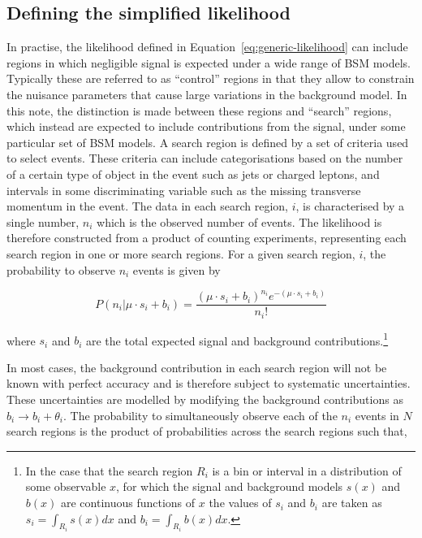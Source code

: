 \subsection{Defining the simplified likelihood}
In practise, the likelihood defined in Equation~\ref{eq:generic-likelihood} can include regions in which negligible signal is expected under a wide 
range of BSM models. Typically these are referred to as ``control'' regions in that they allow to constrain the nuisance parameters that  
cause large variations in the background model.
In this note, the distinction is made between these regions and ``search'' regions, which instead 
are expected to include contributions from the signal, under some particular set of BSM models. A search region 
is defined by a set of criteria used to select events. These criteria can include categorisations based on 
the number of a certain type of object in the event such as jets or 
charged leptons, and intervals in some discriminating variable such as the missing transverse momentum in the event. The data in each search region, $i$, is characterised 
by a single number, $n_{i}$ which is the observed number of events. The likelihood is therefore constructed from a product of counting 
experiments, representing each search region in one or more search regions. 
For a given search region, $i$, the probability to observe $n_{i}$ events is given by

\begin{equation}
 P(n_{i}|\mu \cdot s_{i}+b_{i}) = \dfrac{(\mu \cdot s_{i}+b_{i})^{n_{i}} e^{-(\mu \cdot s_{i}+b_{i})} }{n_{i}!}
\label{eq:poisson-likelihood}
\end{equation}

where $s_{i}$ and $b_{i}$ are the total expected signal and background contributions.\footnote{In the case 
that the search region $R_{i}$ is a bin or interval in a distribution of some observable $x$, for which the signal and background models $s(x)$ 
and $b(x)$ are continuous functions of $x$ the values of $s_{i}$ and $b_{i}$ are taken as 
$s_{i}=\int_{R_{i}} s(x)dx$ and $b_{i}=\int_{R_{i}} b(x)dx$.}

In most cases, the background contribution in each search region will not be known with perfect accuracy and is therefore 
subject to systematic uncertainties. These uncertainties are modelled by modifying the background contributions as 
$b_{i}\rightarrow b_{i}+\theta_{i}$. 
The probability to simultaneously observe each of the $n_{i}$ events in $N$ search regions is the product of probabilities across the search regions such that,

